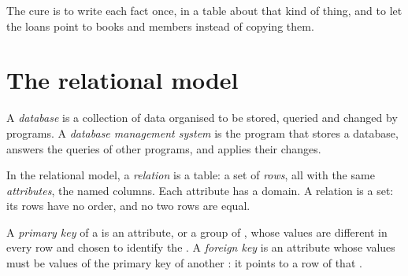 The cure is to write each fact once, in a table about that kind of thing, and to let the loans point to books and
members instead of copying them.

\section{The relational model}\label{sec:g12:relational-databases-sql:model}

\begin{definition}\label{def:g12:relational-databases-sql:database}
A \emph{database} is a collection of data organised to be stored, queried and changed by programs. A
\emph{database management system} is the program that stores a database, answers
the queries of other programs, and applies their changes.
\end{definition}

\begin{definition}\label{def:g12:relational-databases-sql:relation}
In the relational model, a \emph{relation} is a table: a set of \emph{rows}, all
with the same \emph{attributes}, the named columns. Each attribute has a domain. A relation
is a set: its rows have no order, and no two rows are equal.
\end{definition}

\begin{definition}\label{def:g12:relational-databases-sql:keys}
A \emph{primary key} of a  is an attribute, or a group of , whose values are
different in every row and chosen to identify the . A \emph{foreign key} is an attribute whose
values must be values of the primary key of another : it points to a row of that .
\end{definition}

